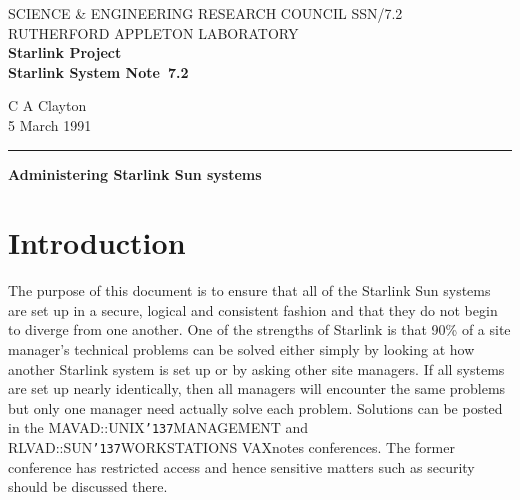\pagestyle{myheadings}

\newcommand{\stardoccategory}  {Starlink System Note}
\newcommand{\stardocinitials}  {SSN}
\newcommand{\stardocnumber}    {7.2}
\newcommand{\stardocauthors}   {C A Clayton}
\newcommand{\stardocdate}      {5 March 1991}
\newcommand{\stardoctitle}     {Administering Starlink Sun systems}

\newcommand{\stardocname}{\stardocinitials /\stardocnumber}
\renewcommand{\_}{{\tt\char'137}}     %
\markright{\stardocname}
\setlength{\textwidth}{160mm}
\setlength{\textheight}{240mm}
\setlength{\topmargin}{-5mm}
\setlength{\oddsidemargin}{0mm}
\setlength{\evensidemargin}{0mm}
\setlength{\parindent}{0mm}
\setlength{\parskip}{\medskipamount}
\setlength{\unitlength}{1mm}



\thispagestyle{empty}
SCIENCE \& ENGINEERING RESEARCH COUNCIL \hfill \stardocname\\
RUTHERFORD APPLETON LABORATORY\\
{\large\bf Starlink Project\\}
{\large\bf \stardoccategory\ \stardocnumber}
\begin{flushright}
\stardocauthors\\
\stardocdate
\end{flushright}
\vspace{-4mm}
\rule{\textwidth}{0.5mm}
\vspace{5mm}
\begin{center}
{\Large\bf \stardoctitle}
\end{center}
\vspace{5mm}

\setlength{\parskip}{0mm}
\tableofcontents
\setlength{\parskip}{\medskipamount}
\markright{\stardocname}

\newpage

\section {Introduction}

The purpose of this document is to ensure that all of the Starlink Sun systems
are set up in a secure, logical and consistent fashion and
that they do not begin to diverge from one another. One of the strengths of 
Starlink is that 90\% of a site manager's technical problems can be
solved either simply by looking at how another Starlink system is set up or by
asking other site managers. If all systems are set up nearly identically,
then all managers will encounter the same problems but only one manager need 
actually solve each problem. Solutions can be posted in the MAVAD::UNIX\_MANAGEMENT
and RLVAD::SUN\_WORKSTATIONS VAXnotes conferences. The former conference 
has restricted access and hence sensitive matters such as security
should be discussed there.

